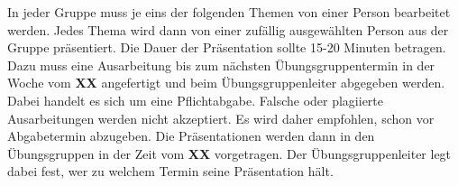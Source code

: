 \documentclass{programmierpraktikum}
\subtitle{Seminarreferate}
\begin{document}
\maketitle
%
In jeder Gruppe muss je eins der folgenden Themen von einer Person be\-ar\-bei\-tet werden. Jedes Thema wird dann von einer zufällig ausgewählten Person aus der Gruppe präsentiert. Die Dauer der Präsentation sollte 15-20 Minuten betragen. Dazu muss eine Ausarbeitung bis zum nächsten Übungsgruppentermin in der Woche vom \textbf{XX} angefertigt und beim Übungsgruppenleiter ab\-ge\-ge\-ben werden. Dabei handelt es sich um eine Pflichtabgabe. Falsche oder plagiierte Ausarbeitungen werden nicht akzeptiert. Es wird daher empfohlen, schon vor Abgabetermin abzugeben. Die Präsentationen werden dann in den Übungsgruppen in der Zeit vom \textbf{XX} vorgetragen. Der Übungsgruppenleiter legt dabei fest, wer zu welchem Termin seine Präsentation hält.
\end{document}
